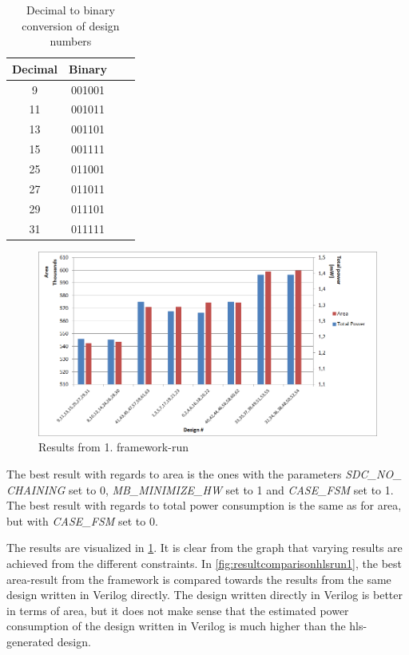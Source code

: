 \begin{table}[hbtp]
    \centering
    \begin{tabular}{cccc}
    \textbf{Decimal} & \textbf{Binary}\\
    \toprule
    9 & 001001 \\
    11 & 001011 \\
    13 & 001101 \\
    15 & 001111 \\
    25 & 011001 \\
    27 & 011011 \\
    29 & 011101 \\
    31 & 011111 \\
    \bottomrule
    \end{tabular}
    \caption{Decimal to binary conversion of design numbers}
    \label{tab:dectobinconstraints}
\end{table}

\begin{figure}[hbpt]
\centering
\includegraphics[width=\textwidth]{../figs/resultGraph.png}
\caption{\label{fig:resultgraphhlsrun1}Results from 1. framework-run}
\end{figure}
The best result with regards to area is the ones with the parameters \textit{SDC\_NO\_ CHAINING} set to 0, \textit{MB\_MINIMIZE\_HW} set to 1 and \textit{CASE\_FSM} set to 1. The best result with regards to total power consumption is the same as for area, but with \textit{CASE\_FSM} set to 0.

The results are visualized in \cref{fig:resultgraphhlsrun1}. It is clear from the graph that varying results are achieved from the different constraints. In \cref{fig:resultcomparisonhlsrun1}, the best area-result from the framework is compared towards the results from the same design written in Verilog directly. The design written directly in Verilog is better in terms of area, but it does not make sense that the estimated power consumption of the design written in Verilog is much higher than the \gls{hls}-generated design.

